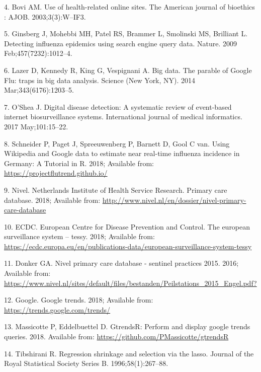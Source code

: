 \documentclass[]{article}
\begin{document}
\leavevmode\hypertarget{ref-Bovi2003}{}%
4. Bovi AM. Use of health-related online sites. The American journal of
bioethics : AJOB. 2003;3(3):W--IF3.

\leavevmode\hypertarget{ref-Ginsberg2009}{}%
5. Ginsberg J, Mohebbi MH, Patel RS, Brammer L, Smolinski MS, Brilliant
L. Detecting influenza epidemics using search engine query data. Nature.
2009 Feb;457(7232):1012--4.

\leavevmode\hypertarget{ref-Lazer2014}{}%
6. Lazer D, Kennedy R, King G, Vespignani A. Big data. The parable of
Google Flu: traps in big data analysis. Science (New York, NY). 2014
Mar;343(6176):1203--5.

\leavevmode\hypertarget{ref-OShea2017}{}%
7. O'Shea J. Digital disease detection: A systematic review of
event-based internet biosurveillance systems. International journal of
medical informatics. 2017 May;101:15--22.

\leavevmode\hypertarget{ref-PFT2017}{}%
8. Schneider P, Paget J, Spreeuwenberg P, Barnett D, Gool C van. Using
Wikipedia and Google data to estimate near real-time influenza incidence
in Germany: A Tutorial in R. 2018; Available from:
\url{https://projectflutrend.github.io/}

\leavevmode\hypertarget{ref-Nivel2018}{}%
9. Nivel. Netherlands Institute of Health Service Research. Primary care
database. 2018; Available from:
\url{http://www.nivel.nl/en/dossier/nivel-primary-care-database}

\leavevmode\hypertarget{ref-ECDC2018}{}%
10. ECDC. European Centre for Disease Prevention and Control. The
european surveillance system -- tessy. 2018; Available from:
\url{https://ecdc.europa.eu/en/publications-data/european-surveillance-system-tessy}

\leavevmode\hypertarget{ref-Donker2015}{}%
11. Donker GA. Nivel primary care database - sentinel practices 2015.
2016; Available from:
\url{https://www.nivel.nl/sites/default/files/bestanden/Peilstations_2015_Engel.pdf?}

\leavevmode\hypertarget{ref-GT2018}{}%
12. Google. Google trends. 2018; Available from:
\url{https://trends.google.com/trends/}

\leavevmode\hypertarget{ref-gtrendsR}{}%
13. Massicotte P, Eddelbuettel D. GtrendsR: Perform and display google
trends queries. 2018. Available from:
\url{https://github.com/PMassicotte/gtrendsR}

\leavevmode\hypertarget{ref-Tibshirani1996}{}%
14. Tibshirani R. Regression shrinkage and selection via the lasso.
Journal of the Royal Statistical Society Series B. 1996;58(1):267--88.
\end{document}
